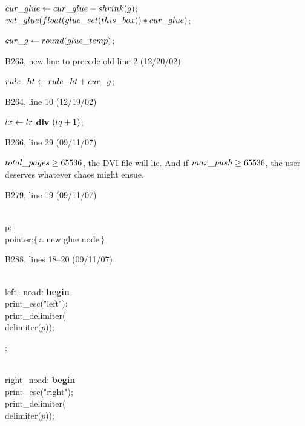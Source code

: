 {{\ninepoint\noindent
\qquad{} $\\{cur\_glue}\gets\\{cur\_glue}-\\{shrink}(g)$;
 $\\{vet\_glue}(\\{float}(\\{glue\_set}(\\{this\_box}))*\\{cur\_glue})$;\par
\noindent\qquad\qquad$\\{cur\_g}\gets\\{round}(\\{glue\_temp})$;

\bugonpage B263, new line to precede old line 2 (12/20/02)

\ninepoint\noindent
\quad$\\{rule\_ht}\gets\\{rule\_ht}+\\{cur\_g}$;

\bugonpage B264, line 10 (12/19/02)

\ninepoint\noindent
{} $\\{lx}\gets\\{lr}$ {\bf div} $(\\{lq}+1)$;

\bugonpage B266, line 29 (09/11/07)

\tenpoint\noindent
$\\{total\_pages}\ge65536$, the \.{DVI} file will lie. And if
$\\{max\_push}\ge65536$, the user deserves whatever chaos might ensue.

\bugonpage B279, line 19 (09/11/07)

\ninepoint\noindent
\qquad\\{p}: \\{pointer};\quad$\{\,$a new glue node$\,\}$

\bugonpage B288, lines 18--20 (09/11/07)

\ninepoint\noindent
\\{left\_noad}: {\bf begin} \\{print\_esc}(\.{"left"});
  \\{print\_delimiter}(\\{delimiter}($p$));\par\noindent
{};\par\noindent
\\{right\_noad}: {\bf begin} \\{print\_esc}(\.{"right"});
  \\{print\_delimiter}(\\{delimiter}($p$));

}}
